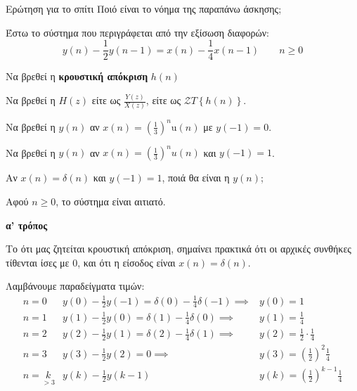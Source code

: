 \documentclass[11pt,a4paper,notitlepage,fleqn,draft]{article}
\begin{document}
\begin{questionbox}{Ερώτηση για το σπίτι}
	Ποιό είναι το νόημα της παραπάνω άσκησης;
\end{questionbox}

\begin{exercise}
	Έστω το σύστημα που περιγράφεται από την εξίσωση διαφορών:
	\[
	y(n) - \frac{1}{2}y(n-1) = x(n) - \frac{1}{4}x(n-1) \qquad n\geq0
	\]
	
	\begin{enumpar}
		\item Να βρεθεί η \textbf{κρουστική απόκριση} \( h(n) \)
		\item Να βρεθεί η \( H(z)\) είτε ως \( \frac{Y(z)}{X(z)} \), είτε ως \( \mathcal{Z}T\left\lbrace h(n) \right\rbrace \).
		\item Να βρεθεί η \( y(n) \) αν \( \displaystyle x(n) = \left(\frac{1}{3}\right)^n \mathrm{u}(n) \) με \( y(-1) = 0 \).
		\item Να βρεθεί η \( y(n) \) αν \( x(n) = \left(\frac{1}{3}\right)^n u(n) \) και
		\( y(-1) = 1 \).
		\item Αν \( x(n) = δ(n) \) και \( y(-1) = 1 \), ποιά θα είναι η \( y(n) \);
	\end{enumpar}
	\tcblower
	Αφού \( n \geq 0 \), το σύστημα είναι αιτιατό.
	\begin{enumpar}
		\item
		\begin{enumgreekpar}
			\item \textbf{α' τρόπος}
			
			Το ότι μας ζητείται κρουστική απόκριση, σημαίνει πρακτικά ότι οι αρχικές συνθήκες τίθενται ίσες με 0, και ότι η είσοδος είναι \( x(n)=δ(n) \).
			
			Λαμβάνουμε παραδείγματα τιμών:\[
			\begin{array}{crl}
			n=0 & y(0)-\frac{1}{2}y(-1)=\delta(0)-\frac{1}{4}δ(-1) \implies & y(0)=1\\
			n=1 & y(1)-\frac{1}{2}y(0) =δ(1)-\frac{1}{4}δ(0)\implies & y(1)=\frac{1}{4}\\
			n=2 & y(2)-\frac{1}{2}y(1) = δ(2)-\frac{1}{4}δ(1)\implies & y(2) = \frac{1}{2}\cdot\frac{1}{4}\\
			n=3 & y(3)-\frac{1}{2}y(2) = 0 \implies & y(3) = \left(\frac{1}{2}\right)^{2}\frac{1}{4}\\
			n=\underset{>3}{k} & y(k)-\frac{1}{2}y(k-1) & y(k) = \left(\frac{1}{2}\right)^{k-1}\frac{1}{4}
			\end{array}
			\]
			

\end{enumgreekpar}
\end{enumpar}
\end{exercise}
\end{document}
